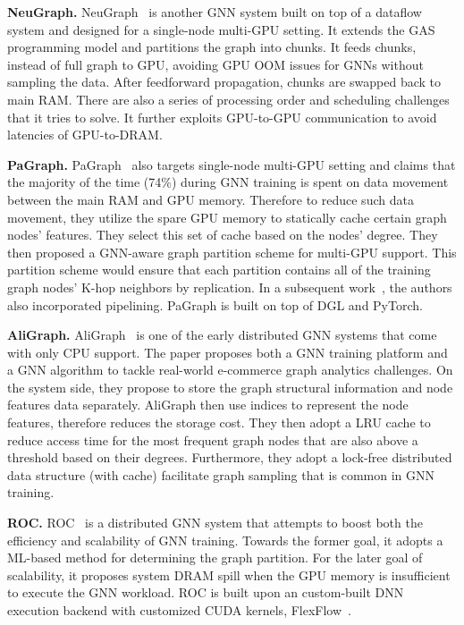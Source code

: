 \vspace{2mm}
\noindent \textbf{NeuGraph.}
NeuGraph~\cite{neugraph} is another GNN system built on top of a dataflow system and designed for a single-node multi-GPU setting. It extends the GAS~\cite{powergraph} programming model and partitions the graph into chunks. It feeds chunks, instead of full graph to GPU, avoiding GPU OOM issues for GNNs without sampling the data. After feedforward propagation, chunks are swapped back to main RAM. There are also a series of processing order and scheduling challenges that it tries to solve. It further exploits GPU-to-GPU communication to avoid latencies of GPU-to-DRAM. 

\vspace{2mm}
\noindent \textbf{PaGraph.}
PaGraph~\cite{pagraph, pagraph2} also targets single-node multi-GPU setting and claims that the majority of the time (74\%) during GNN training is spent on data movement between the main RAM and GPU memory. Therefore to reduce such data movement, they utilize the spare GPU memory to statically cache certain graph nodes' features. They select this set of cache based on the nodes' degree. They then proposed a GNN-aware graph partition scheme for multi-GPU support. This partition scheme would ensure that each partition contains all of the training graph nodes' K-hop neighbors by replication. In a subsequent work~\cite{pagraph2}, the authors also incorporated pipelining. PaGraph is built on top of DGL and PyTorch.

\vspace{2mm}
\noindent \textbf{AliGraph.} 
AliGraph~\cite{aligraph} is one of the early distributed GNN systems that come with only CPU support. The paper proposes both a GNN training platform and a GNN algorithm to tackle real-world e-commerce graph analytics challenges. On the system side, they propose to store the graph structural information and node features data separately. AliGraph then use indices to represent the node features, therefore reduces the storage cost. They then adopt a LRU cache to reduce access time for the most frequent graph nodes that are also above a threshold based on their degrees. Furthermore, they adopt a lock-free distributed data structure (with cache) facilitate graph sampling that is common in GNN training.

\vspace{2mm}
\noindent \textbf{ROC.} 
ROC~\cite{roc} is a distributed GNN system that attempts to boost both the efficiency and scalability of GNN training. Towards the former goal, it adopts a ML-based method for determining the graph partition. For the later goal of scalability, it proposes system DRAM spill when the GPU memory is insufficient to execute the GNN workload. ROC is built upon an custom-built DNN execution backend with customized CUDA kernels, FlexFlow~\cite{flexflow}.


